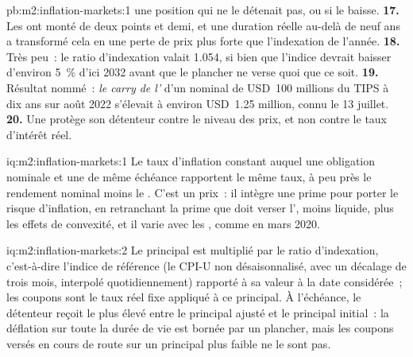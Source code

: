 \begin{solution}{pb:m2:inflation-markets:1}
une position qui ne le détenait pas, ou si le  baisse.
\textbf{17.} Les  ont monté de deux points et demi, et une duration réelle au-delà
de neuf ans a transformé cela en une perte de prix plus forte que l'indexation de l'année.
\textbf{18.} Très peu~: le ratio d'indexation valait 1.054, si bien que l'indice devrait baisser
d'environ 5~\% d'ici 2032 avant que le plancher ne verse quoi que ce soit.
\textbf{19.} Résultat nommé~: \emph{le carry de l'} d'un nominal de USD~100 millions du
TIPS à dix ans sur août 2022 s'élevait à environ USD~1.25 million, connu le 13 juillet.
\textbf{20.} Une  protège son détenteur contre le niveau des prix, et non contre
le taux d'intérêt réel.
\end{solution}

\begin{solution}{iq:m2:inflation-markets:1}
Le taux d'inflation constant auquel une obligation nominale et une 
de même échéance rapportent le même taux, à peu près le rendement nominal moins le
. C'est un prix~: il intègre une prime pour porter le risque d'inflation,
en retranchant la prime que doit verser l', moins liquide, plus les effets de convexité, et il
varie avec les , comme en mars 2020.
\end{solution}

\begin{solution}{iq:m2:inflation-markets:2}
Le principal est multiplié par le ratio d'indexation, c'est-à-dire l'indice de référence (le
CPI-U non désaisonnalisé, avec un décalage de trois mois, interpolé quotidiennement) rapporté
à sa valeur à la date considérée~; les coupons sont le taux réel fixe appliqué à ce principal.
À l'échéance, le détenteur reçoit le plus élevé entre le principal ajusté et le principal
initial~: la déflation sur toute la durée de vie est bornée par un plancher, mais les coupons
versés en cours de route sur un principal plus faible ne le sont pas.
\end{solution}

